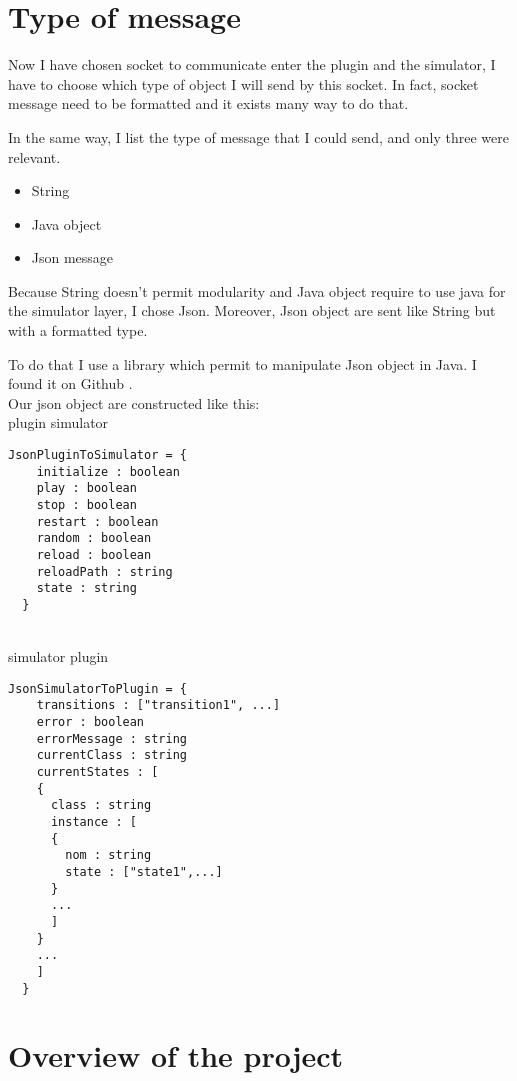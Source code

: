 \section{Type of message}

Now I have chosen socket to communicate enter the plugin and the simulator, I have to choose which type of object I will send by this socket. In fact, socket message need to be formatted and it exists many way to do that.

In the same way, I list the type of message that I could send, and only three were relevant.

\begin{itemize}
\item String
\item Java object
\item Json message
\end{itemize}

Because String doesn't permit modularity and Java object require to use java for the simulator layer, I chose Json. Moreover, Json object are sent like String but with a formatted type.

To do that I use a library which permit to manipulate Json object in Java. I found it on Github \cite{json}.
~\\

Our json object are constructed like this:
~\\

plugin \overrightarrow{} simulator
\begin{lstlisting}[style=json]
  JsonPluginToSimulator = {
    initialize : boolean
    play : boolean
    stop : boolean
    restart : boolean
    random : boolean
    reload : boolean
    reloadPath : string
    state : string
  }
\end{lstlisting}

~\\

simulator \overrightarrow{} plugin
\begin{lstlisting}[style=json]
  JsonSimulatorToPlugin = {
    transitions : ["transition1", ...]
    error : boolean
    errorMessage : string
    currentClass : string
    currentStates : [
    {
      class : string
      instance : [
      {
        nom : string
        state : ["state1",...]
      }
      ...
      ]
    }
    ...
    ]
  }

\end{lstlisting}


\section{Overview of the project}

